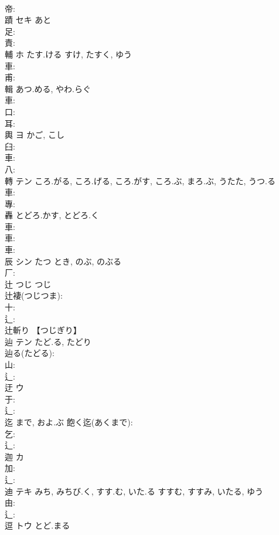 \documentclass[8pt]{extreport}
\begin{document}
\begin{CJK}{UTF8}{min}
\\	帝: 
\\	蹟	セキ	あと		
\\	足: 
\\	責: 
\\	輔	ホ	たす.ける	すけ, たすく, ゆう	
\\	車: 
\\	甫: 
\\	輯		あつ.める, やわ.らぐ				
\\	車: 
\\	口: 
\\	耳: 
\\	輿	ヨ	かご, こし		
\\	臼: 
\\	車: 
\\	八: 
\\	轉	テン	ころ.がる, ころ.げる, ころ.がす, ころ.ぶ, まろ.ぶ, うたた, うつ.る				
\\	車: 
\\	專: 
\\	轟		とどろ.かす, とどろ.く				
\\	車: 
\\	車: 
\\	車: 
\\	辰	シン	たつ	とき, のぶ, のぶる	
\\	厂: 
\\	辻	つじ	つじ		
\\	辻褄(つじつま): 
\\	十: 
\\	辶: 
\\	辻斬り 【つじぎり】 
\\	辿	テン	たど.る, たどり		
\\	辿る(たどる): 
\\	山: 
\\	辶: 
\\	迂	ウ			
\\	于: 
\\	辶: 
\\	迄		まで, およ.ぶ			飽く迄(あくまで): 
\\	乞: 
\\	辶: 
\\	迦	カ			
\\	加: 
\\	辶: 
\\	迪	テキ	みち, みちび.く, すす.む, いた.る	すすむ, すすみ, いたる, ゆう	
\\	由: 
\\	辶: 
\\	逗	トウ	とど.まる		

\end{CJK}
\end{document}

